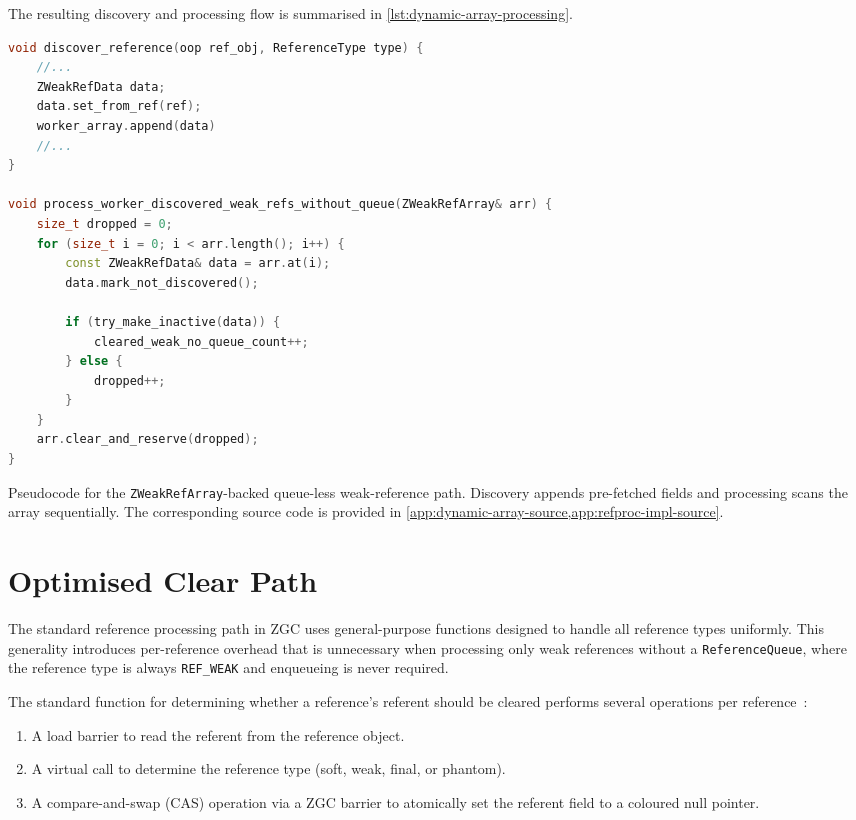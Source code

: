 The resulting discovery and processing flow is summarised in \cref{lst:dynamic-array-processing}.

\begin{listing}[htbp]
\begin{lstlisting}[language=C++]
void discover_reference(oop ref_obj, ReferenceType type) {
    //...
    ZWeakRefData data;
    data.set_from_ref(ref); 
    worker_array.append(data)
    //...
}

void process_worker_discovered_weak_refs_without_queue(ZWeakRefArray& arr) {
    size_t dropped = 0;
    for (size_t i = 0; i < arr.length(); i++) {
        const ZWeakRefData& data = arr.at(i);
        data.mark_not_discovered();

        if (try_make_inactive(data)) {
            cleared_weak_no_queue_count++;
        } else {
            dropped++;
        }
    }
    arr.clear_and_reserve(dropped);
}
\end{lstlisting}
\caption[Dynamic-array weak processing]{Pseudocode for the \texttt{ZWeakRefArray}-backed queue-less weak-reference path. Discovery appends pre-fetched fields and processing scans the array sequentially. The corresponding source code is provided in \cref{app:dynamic-array-source,app:refproc-impl-source}.}
\label{lst:dynamic-array-processing}
\end{listing}

\section{Optimised Clear Path}
\label{sec:optimised-clear-path}

The standard reference processing path in ZGC uses general-purpose functions designed to handle all reference types uniformly. This generality introduces per-reference overhead that is unnecessary when processing only weak references without a \texttt{ReferenceQueue}, where the reference type is always \texttt{REF\_WEAK} and enqueueing is never required.

The standard function for determining whether a reference's referent should be cleared performs several operations per reference~\cite{openjdk-zreferenceprocessor-cpp,openjdk-zbarrier-cpp}:
\begin{enumerate}
    \item A load barrier to read the referent from the reference object.
    \item A virtual call to determine the reference type (soft, weak, final, or phantom).
    \item A compare-and-swap (CAS) operation via a ZGC barrier to atomically set the referent field to a coloured null pointer.
\end{enumerate}

